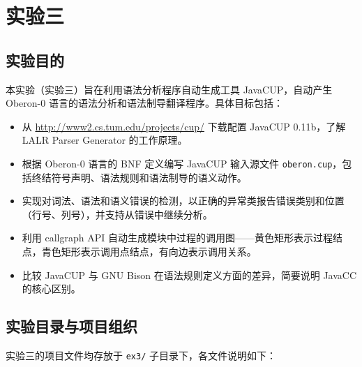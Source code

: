 \chapter{实验三}

\section*{实验目的}

本实验（实验三）旨在利用语法分析程序自动生成工具 JavaCUP，自动产生 Oberon-0 语言的语法分析和语法制导翻译程序。具体目标包括：

\begin{itemize}
    \item 从 \url{http://www2.cs.tum.edu/projects/cup/} 下载配置 JavaCUP 0.11b，了解 LALR Parser Generator 的工作原理。
    \item 根据 Oberon-0 语言的 BNF 定义编写 JavaCUP 输入源文件 \texttt{oberon.cup}，包括终结符号声明、语法规则和语法制导的语义动作。
    \item 实现对词法、语法和语义错误的检测，以正确的异常类报告错误类别和位置（行号、列号），并支持从错误中继续分析。
    \item 利用 callgraph API 自动生成模块中过程的调用图——黄色矩形表示过程结点，青色矩形表示调用点结点，有向边表示调用关系。
    \item 比较 JavaCUP 与 GNU Bison 在语法规则定义方面的差异，简要说明 JavaCC 的核心区别。
\end{itemize}

\section*{实验目录与项目组织}

实验三的项目文件均存放于 \texttt{ex3/} 子目录下，各文件说明如下：

